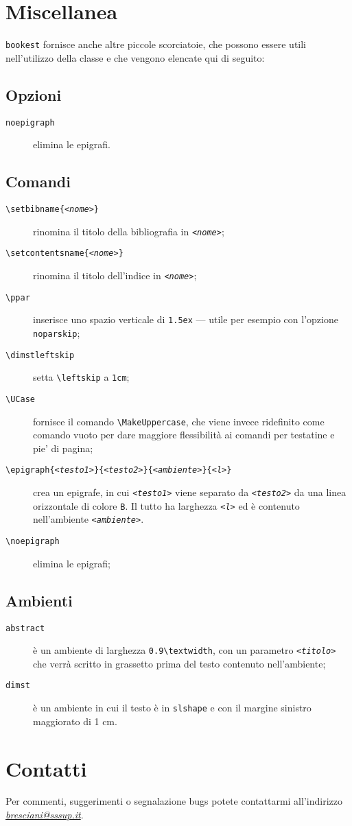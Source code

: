 \documentclass[a4paper,oneside,centered,noparindent,noparskip]{bookest}
\begin{document}
\section{Miscellanea}
\texttt{bookest} fornisce anche altre piccole scorciatoie, che possono essere utili nell'utilizzo della classe e che vengono elencate qui di seguito:

\subsection{Opzioni}
\begin{description}
 \item[\texttt{noepigraph}] elimina le epigrafi.
\end{description}

\subsection{Comandi}
\begin{description}
 \item[\texttt{\textbackslash setbibname\{\textit{<nome>}\}}] rinomina il titolo della bibliografia in \texttt{\textit{<nome>}};
 \item[\texttt{\textbackslash setcontentsname\{\textit{<nome>}\}}] rinomina il titolo dell'indice in \texttt{\textit{<nome>}};
 \item[\texttt{\textbackslash ppar}] inserisce uno spazio verticale di \texttt{1.5ex} --- utile per esempio con l'opzione \texttt{noparskip};
 \item[\texttt{\textbackslash dimstleftskip}] setta \texttt{\textbackslash leftskip} a \texttt{1cm};
 \item[\texttt{\textbackslash UCase}] fornisce il comando \texttt{\textbackslash MakeUppercase}, che viene invece ridefinito come comando vuoto per dare maggiore flessibilità ai comandi per testatine e pie' di pagina;
 \item[\texttt{\textbackslash epigraph\{\textit{<testo1>}\}\{\textit{<testo2>}\}\{\textit{<ambiente>}\}\{\textit{<l>}\}}] crea un epigrafe, in cui \texttt{\textit{<testo1>}} viene separato da \texttt{\textit{<testo2>}} da una linea orizzontale di colore \texttt{B}. Il tutto ha larghezza \texttt{\textit{<l>}} ed è contenuto nell'ambiente \texttt{\textit{<ambiente>}}.
  \item[\texttt{\textbackslash noepigraph}] elimina le epigrafi;
\end{description}

\subsection{Ambienti}
\begin{description}
 \item[\texttt{abstract}] è un ambiente di larghezza \texttt{0.9\textbackslash textwidth}, con un parametro \texttt{\textit{<titolo>}} che verrà scritto in grassetto prima del testo contenuto nell'ambiente;
\item[\texttt{dimst}] è un ambiente in cui il testo è in \texttt{slshape} e con il margine sinistro maggiorato di 1 cm.
\end{description}

\section{Contatti}
Per commenti, suggerimenti o segnalazione bugs potete contattarmi all'indirizzo \href{mailto:bresciani@sssup.it}{\textit{bresciani@sssup.it}}.
\end{document}
